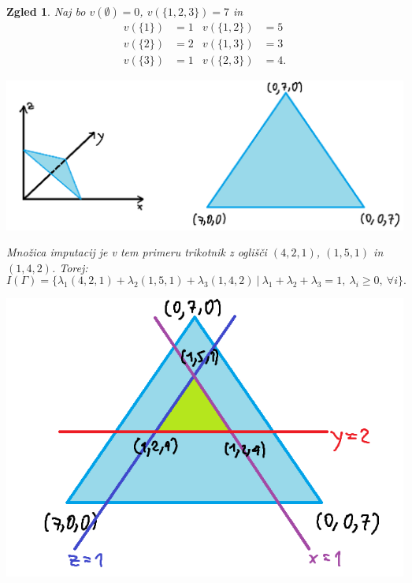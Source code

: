 \documentclass[10pt, a4paper]{article}
\newtheorem{zgled}[izr]{Zgled}
\begin{document}
\begin{zgled}
  Naj bo $v(\emptyset) = 0$, $v(\{1, 2, 3\}) = 7$ in 
  \begin{align*}
    v(\{1\}) &= 1 & v(\{1, 2\}) &= 5\\
    v(\{2\}) &= 2 & v(\{1, 3\}) &= 3\\
    v(\{3\}) &= 1 & v(\{2, 3\}) &= 4.
  \end{align*}
  \begin{center}
    \includegraphics[scale=0.6]{images/slika1.png}
  \end{center}
  Množica imputacij je v tem primeru trikotnik z oglišči 
  $(4, 2, 1)$, $(1, 5, 1)$ in $(1, 4, 2)$. Torej:
  $$I(\Gamma) = \{\lambda_1 (4, 2, 1) + \lambda_2 (1, 5, 1) + \lambda_3 (1, 4, 2)\ |\ \lambda_1 + \lambda_2 + \lambda_3 = 1,\ \lambda_i \geq 0,\ \forall i\}.$$
  \begin{center}
    \includegraphics[scale=0.8]{images/slika2.png}
  \end{center}
\end{zgled}
\end{document}
